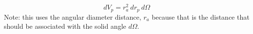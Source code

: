 \begin{equation}
  dV_p = r_a^2\ dr_p\ d\Omega
\end{equation}
Note: this uses the angular diameter distance, $r_a$ because that is the distance that should be associated with the solid angle $d\Omega$. 
  